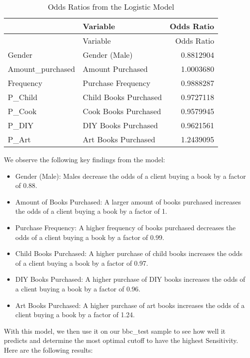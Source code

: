 \documentclass[
]{article}
\begin{document}
\begin{longtable}[]{@{}llr@{}}
\caption{Odds Ratios from the Logistic Model}\tabularnewline
\toprule\noalign{}
& Variable & Odds Ratio \\
\midrule\noalign{}
\endfirsthead
\toprule\noalign{}
& Variable & Odds Ratio \\
\midrule\noalign{}
\endhead
\bottomrule\noalign{}
\endlastfoot
Gender & Gender (Male) & 0.8812904 \\
Amount\_purchased & Amount Purchased & 1.0003680 \\
Frequency & Purchase Frequency & 0.9888287 \\
P\_Child & Child Books Purchased & 0.9727118 \\
P\_Cook & Cook Books Purchased & 0.9579945 \\
P\_DIY & DIY Books Purchased & 0.9621561 \\
P\_Art & Art Books Purchased & 1.2439095 \\
\end{longtable}

We observe the following key findings from the model:

\begin{itemize}
\item
  Gender (Male): Males decrease the odds of a client buying a book by a
  factor of 0.88.
\item
  Amount of Books Purchased: A larger amount of books purchased
  increases the odds of a client buying a book by a factor of 1.
\item
  Purchase Frequency: A higher frequency of books purchased decreases
  the odds of a client buying a book by a factor of 0.99.
\item
  Child Books Purchased: A higher purchase of child books increases the
  odds of a client buying a book by a factor of 0.97.
\item
  DIY Books Purchased: A higher purchase of DIY books increases the odds
  of a client buying a book by a factor of 0.96.
\item
  Art Books Purchased: A higher purchase of art books increases the odds
  of a client buying a book by a factor of 1.24.
\end{itemize}

With this model, we then use it on our bbc\_test sample to see how well
it predicts and determine the most optimal cutoff to have the highest
Sensitivity. Here are the following results:
\end{document}
